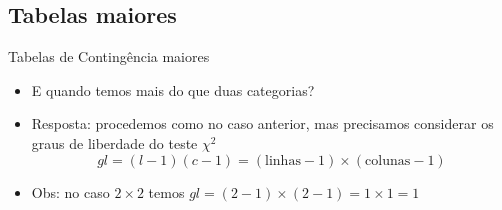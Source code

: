 \documentclass{beamer}
\begin{document}
\subsection{Tabelas maiores}

\begin{frame}{\scriptsize Tabelas de Contingência maiores}
  \small
  \begin{itemize}
  \item E quando temos mais do que duas categorias?
    \bigskip
  \item Resposta: procedemos como no caso anterior, mas precisamos
    considerar os \alert{graus de liberdade} do teste $\chi^2$
    \begin{displaymath}
        gl = (l-1)(c-1) = (\text{linhas} -1)\times (\text{colunas}-1)
    \end{displaymath}
    \bigskip
  \item Obs: no caso $2 \times 2$ temos $gl = (2-1) \times (2-1)=1
    \times 1 = 1$
  \end{itemize}
\end{frame}




\end{document}
